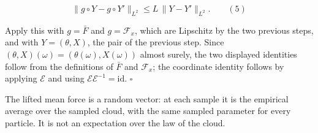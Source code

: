 \documentclass[11pt,a4paper]{report}
\begin{document}
\[\|g\circ Y-g\circ Y'\|_{L^2}\le L\,\|Y-Y'\|_{L^2}.\qquad(5)\]


Apply this with \(g=\bar F\) and \(g=\mathcal F_x\), which are Lipschitz by the two previous steps, and with \(Y=(\theta,X)\), the pair of the previous step. Since \((\theta,X)(\omega)=(\theta(\omega),X(\omega))\) almost surely, the two displayed identities follow from the definitions of \(\bar F\) and \(\mathcal F_x\); the coordinate identity follows by applying \(\mathcal E\) and using \(\mathcal E\mathcal E^{-1}=\mathrm{id}\). \(\square\)




The lifted mean force is a random vector: at each sample it is the empirical average over the sampled cloud, with the same sampled parameter for every particle. It is not an expectation over the law of the cloud.
\end{document}
